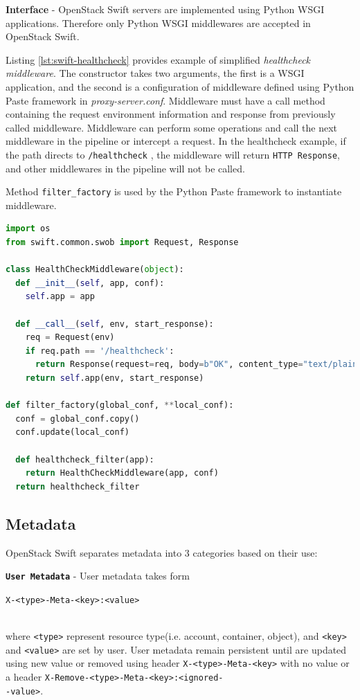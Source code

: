 \documentclass{ExcelAtFIT}
\begin{document}
\textbf{Interface} - OpenStack Swift servers are implemented using Python WSGI applications. Therefore only Python WSGI middlewares are accepted in OpenStack Swift.

Listing \ref{lst:swift-healthcheck} provides example of simplified \textit{healthcheck middleware}. The constructor takes two arguments, the first is a WSGI application, and the second is a configuration of middleware defined using Python Paste framework in \textit{proxy-server.conf}. Middleware must have a call method containing the request environment information and response from previously called middleware. Middleware can perform some operations and call the next middleware in the pipeline or intercept a request. In the healthcheck example, if the path directs to \texttt{/healthcheck} , the middleware will return \texttt{HTTP Response}, and other middlewares in the pipeline will not be called.

Method \texttt{filter\_factory} is used by the Python Paste framework to instantiate middleware.

\begin{lstlisting}[language=Python, style=pythonStyle, caption=Example of healthcheck middleware in OpenStack Swift, label=lst:swift-healthcheck]
import os
from swift.common.swob import Request, Response

class HealthCheckMiddleware(object):
  def __init__(self, app, conf):
    self.app = app

  def __call__(self, env, start_response):
    req = Request(env)
    if req.path == '/healthcheck':
      return Response(request=req, body=b"OK", content_type="text/plain")(env, start_response)
    return self.app(env, start_response)

def filter_factory(global_conf, **local_conf):
  conf = global_conf.copy()
  conf.update(local_conf)

  def healthcheck_filter(app):
    return HealthCheckMiddleware(app, conf)
  return healthcheck_filter
\end{lstlisting}

\subsection{Metadata}
OpenStack Swift separates metadata into 3 categories based on their use:

\textbf{\texttt{User Metadata}} - User metadata takes form \\
\centerline{\texttt{X-<type>-Meta-<key>:<value>}}\\ where \texttt{<type>} represent resource type(i.e. account, container, object), and \texttt{<key>} and \texttt{<value>} are set by user. User metadata remain persistent until are updated using new value or removed using header \texttt{X-<type>-Meta-<key>} with no value or a header \texttt{X-Remove-<type>-Meta-<key>:<ignored-\\-value>}.
\end{document}
